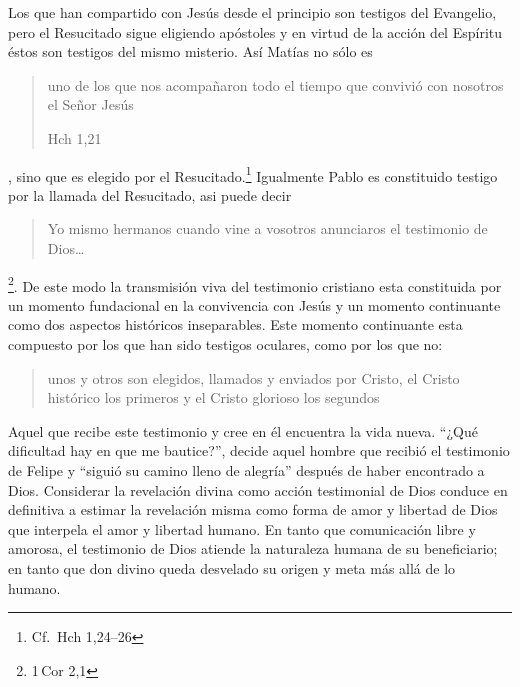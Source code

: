 Los que han compartido con Jesús desde el principio son testigos del Evangelio,
pero el Resucitado sigue eligiendo apóstoles y en virtud de la acción del
Espíritu éstos son testigos del mismo misterio.\autocite[Cf.][576]{ninot2009tf}
Así Matías no sólo es \blockquote[Hch 1,21]{uno de los que nos acompañaron todo
  el tiempo que convivió con nosotros el Señor Jesús}, sino que es elegido por
el Resucitado.\footnote{Cf.~Hch 1,24--26} Igualmente Pablo es constituido
testigo por la llamada del Resucitado, asi puede decir \blockquote{Yo mismo
  hermanos cuando vine a vosotros anunciaros el testimonio de
  Dios\ldots}\footnote{1\,Cor 2,1}. De este modo la transmisión viva del
testimonio cristiano esta constituida por un momento fundacional en la
convivencia con Jesús y un momento continuante como dos aspectos históricos
inseparables.\autocite[Cf.][148]{prades2015testimonio} Este momento continuante
esta compuesto por los que han sido testigos oculares, como por los que no:
\blockquote[{\cite[148]{prades2015testimonio}}]{unos y otros son elegidos,
  llamados y enviados por Cristo, el Cristo histórico los primeros y el Cristo
  glorioso los segundos}. Aquel que recibe este testimonio y cree en él
encuentra la vida nueva. \enquote{¿Qué dificultad hay en que me bautice?},
decide aquel hombre que recibió el testimonio de Felipe y \enquote{siguió su
  camino lleno de alegría} después de haber encontrado a Dios. Considerar la
revelación divina como acción testimonial de Dios conduce en definitiva a
estimar la revelación misma como forma de amor y libertad de Dios que interpela
el amor y libertad humano. En tanto que comunicación libre y amorosa, el
testimonio de Dios atiende la naturaleza humana de su beneficiario; en tanto que
don divino queda desvelado su origen y meta más allá de lo
humano.\autocite[Cf.][152]{prades2015testimonio}

